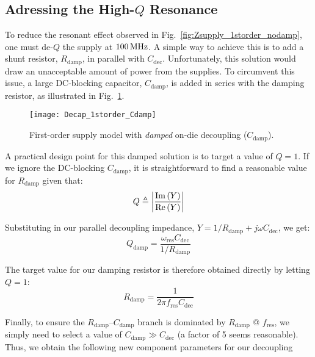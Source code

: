 \subsection{Adressing the High-$Q$ Resonance}
\par To reduce the resonant effect observed in Fig.~\ref{fig:Zsupply_1storder_nodamp},
one must de-$Q$ the supply at $100\mathrm{\,MHz}$.  A simple way to achieve this is
to add a shunt resistor, $R_\mathrm{damp}$, in parallel with $C_\mathrm{dec}$.
Unfortunately, this solution would draw an unacceptable amount of power from
the supplies. To circumvent this issue, a large DC-blocking capacitor,
$C_\mathrm{damp}$, is added in series with the damping resistor, as
illustrated in Fig.~\ref{fig:Decap_1storder_damp}.
%
\begin{figure}[!ht]
	\centering
	\texttt{[image: Decap\_1storder\_Cdamp]}
	\caption{First-order supply model with \emph{damped} on-die decoupling ($C_\mathrm{damp}$).}
\label{fig:Decap_1storder_damp}%
\end{figure}
%
\par A practical design point for this damped solution is to target a value of
$Q=1$. If we ignore the DC-blocking $C_\mathrm{damp}$, it is straightforward
to find a reasonable value for $R_\mathrm{damp}$ given that:
%
\begin{equation}
	Q \triangleq \left |\frac{\mathrm{Im}\left(Y\right)}{\mathrm{Re}\left(Y\right)}\right |
\end{equation}
%
\par\noindent Substituting in our parallel decoupling impedance, 
$Y=1/R_\mathrm{damp} + j\omega C_\mathrm{dec}$, we get:
\begin{equation}
	Q_\mathrm{damp} = \frac{\omega_\mathrm{res} C_\mathrm{dec}}{1/R_\mathrm{damp}}
\end{equation}
%
\par\noindent The target value for our damping resistor is therefore
obtained directly by letting $Q=1$:
\begin{equation}
	R_\mathrm{damp} = \frac{1}{2\pi f_\mathrm{res}C_\mathrm{dec}}
\end{equation}
%
\par Finally, to ensure the $R_\mathrm{damp}$--$C_\mathrm{damp}$ branch is
dominated by $R_\mathrm{damp}$ @ $f_\mathrm{res}$, we simply need to select a
value of $C_\mathrm{damp} \gg C_\mathrm{dec}$ (a factor of 5 seems reasonable).
Thus, we obtain the following new component parameters for our decoupling
